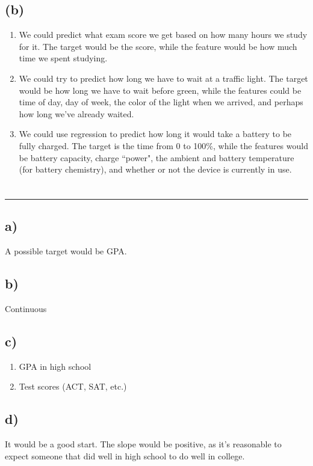 \documentclass[11pt]{article}
\begin{document}
\subsection*{(b)}
\begin{enumerate}
	\item We could predict what exam score we get based on how many hours we study for it. The target would be the score, while the feature would be how much time we spent studying.
	
	\item We could try to predict how long we have to wait at a traffic light. The target would be how long we have to wait before green, while the features could be time of day, day of week, the color of the light when we arrived, and perhaps how long we've already waited.
	
	\item We could use regression to predict how long it would take a battery to be fully charged. The target is the time from 0 to 100\%, while the features would be battery capacity, charge ``power", the ambient and battery temperature (for battery chemistry), and whether or not the device is currently in use.
\end{enumerate}
\newpage

\section{}\hrule
\subsection{a)}
A possible target would be GPA.

\subsection{b)}
Continuous

\subsection{c)}
\begin{enumerate}
	\item GPA in high school
	
	\item Test scores (ACT, SAT, etc.)
\end{enumerate}

\subsection{d)}
It would be a good start. The slope would be positive, as it's reasonable to expect someone that did well in high school to do well in college.
\newpage
\end{document}

